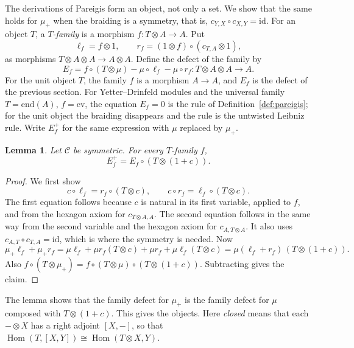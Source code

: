 \documentclass[]{interact}
\theoremstyle{plain}
\newtheorem{lemma}[theorem]{Lemma}
\theoremstyle{definition}
\theoremstyle{remark}
\newcommand{\Hom}{\operatorname{Hom}}
\newcommand{\id}{\mathrm{id}}
\begin{document}
The derivations of Pareigis form an object, not only a set. %
We show that the same holds for $\mu_+$ when the braiding is a symmetry, that is, $c_{Y,X} \circ c_{X,Y} = \id$.
For an object $T$, a \emph{$T$-family} is a morphism $f \colon T \otimes A \to A$. %
Put
\[
\ell_f = f \otimes 1, \qquad
r_f = (1 \otimes f) \circ (c_{T,A} \otimes 1),
\]
as morphisms $T \otimes A \otimes A \to A \otimes A$.
Define the defect of the family by
\[
E_f = f \circ (T \otimes \mu) - \mu \circ \ell_f - \mu \circ r_f \colon T \otimes A \otimes A \to A.
\]
For the unit object $T$, the family $f$ is a morphism $A \to A$, and $E_f$ is the defect of the previous section.
For Yetter--Drinfeld modules and the universal family $T = \mathrm{end}(A)$, $f = \mathrm{ev}$, the equation $E_f = 0$ is the rule of Definition~\ref{def:pareigis}; for the unit object the braiding disappears and the rule is the untwisted Leibniz rule.
Write $E^+_f$ for the same expression with $\mu$ replaced by $\mu_+$.

\begin{lemma}\label{lem:family}
Let $\mathcal{C}$ be symmetric. For every $T$-family $f$,
\[
E^+_f = E_f \circ (T \otimes (1 + c)).
\]
\end{lemma}

\begin{proof}
We first show
\[
c \circ \ell_f = r_f \circ (T \otimes c), \qquad c \circ r_f = \ell_f \circ (T \otimes c).
\]
The first equation follows because $c$ is natural in its first variable, applied to $f$, and from the hexagon axiom for $c_{T \otimes A, A}$.
The second equation follows in the same way from the second variable and the hexagon axiom for $c_{A, T \otimes A}$.
It also uses $c_{A,T} \circ c_{T,A} = \id$, which is where the symmetry is needed.
Now
\[
\mu_+ \ell_f + \mu_+ r_f = \mu \ell_f + \mu r_f (T \otimes c) + \mu r_f + \mu \ell_f (T \otimes c) = \mu(\ell_f + r_f)\,(T \otimes (1 + c)).
\]
Also $f \circ (T \otimes \mu_+) = f \circ (T \otimes \mu) \circ (T \otimes (1 + c))$.
Subtracting gives the claim.
\end{proof}

The lemma shows that the family defect for $\mu_+$ is the family defect for $\mu$ composed with $T \otimes (1 + c)$.
This gives the objects.
Here \emph{closed} means that each $-\otimes X$ has a right adjoint $[X,-]$, so that $\Hom(T, [X,Y]) \cong \Hom(T \otimes X, Y)$.
\end{document}

